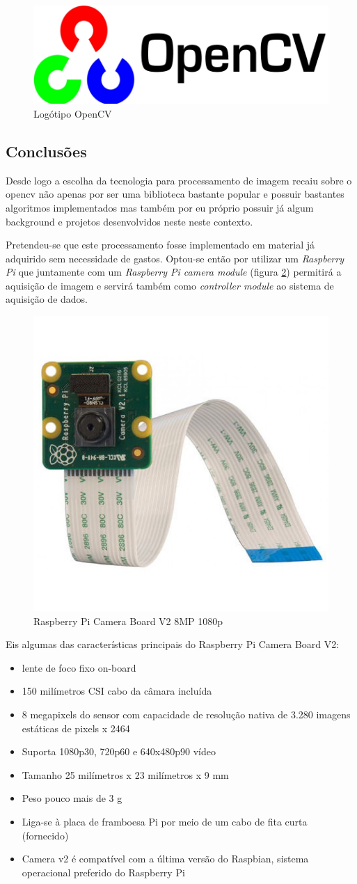 \begin{figure}[!htb]
	\centering
	\includegraphics[width=0.5\linewidth]{img/vision/opencv_logo.jpg}
	\caption{Logótipo OpenCV}
	\label{opencvlogo}
\end{figure}


\subsection{Conclusões}

Desde logo a escolha da tecnologia para processamento de imagem recaiu sobre o opencv não apenas por ser uma biblioteca bastante popular e possuir bastantes algoritmos implementados mas também por eu próprio possuir já algum background e projetos desenvolvidos neste neste contexto.


Pretendeu-se que este processamento fosse implementado em material já adquirido sem necessidade de gastos. Optou-se então por utilizar um \textit{Raspberry Pi} que juntamente com um \textit{Raspberry Pi camera module} (figura \ref{raspicam}) permitirá a aquisição de imagem e servirá também como \textit{controller module} ao sistema de aquisição de dados. 


\begin{figure}[!htb]
	\centering
	\includegraphics[width=0.3\linewidth]{img/hardware/camera_v2.jpg}
	\caption{Raspberry Pi Camera Board V2 8MP 1080p}
	\label{raspicam}
\end{figure}


Eis algumas das características principais do Raspberry Pi Camera Board V2:

\begin{itemize}
\item lente de foco fixo on-board
\item 150 milímetros CSI cabo da câmara incluída
\item 8 megapixels do sensor com capacidade de resolução nativa de 3.280 imagens estáticas de pixels x 2464
\item Suporta 1080p30, 720p60 e 640x480p90 vídeo
\item Tamanho 25 milímetros x 23 milímetros x 9 mm
\item Peso pouco mais de 3 g
\item Liga-se à placa de framboesa Pi por meio de um cabo de fita curta (fornecido)
\item Camera v2 é compatível com a última versão do Raspbian, sistema operacional preferido do Raspberry Pi
\end{itemize}


